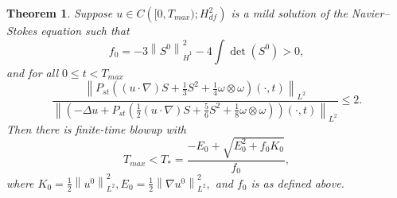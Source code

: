 \documentclass[11pt]{article}
\theoremstyle{plain}
\newtheorem{theorem}{Theorem}[section]
\theoremstyle{remark}
\numberwithin{equation}{section}
\begin{document}
\begin{theorem} \label{BlowupThmIntro}
Suppose $u\in C\left([0,T_{max});H^2_{df}\right)$ is a mild solution of the Navier--Stokes equation such that
\begin{equation}
    f_0=-3\left\|S^0\right\|_{\dot{H}^1}^2
    -4\int\det\left(S^0\right)>0,
\end{equation}
and for all $0\leq t<T_{max}$
\begin{equation}
    \frac{\left\|P_{st}\left((u\cdot\nabla)S+\frac{1}{3}S^2
    +\frac{1}{4}\omega\otimes\omega
    \right)(\cdot,t)\right\|_{L^2}}
    {\left\|\left(-\Delta u+P_{st}\left(
    \frac{1}{2}(u\cdot\nabla)S+\frac{5}{6}S^2
    +\frac{1}{8}\omega\otimes\omega\right)
    \right)(\cdot,t)\right\|_{L^2}}
    \leq
    2.
\end{equation}
Then there is finite-time blowup with
\begin{equation}
    T_{max}
    <
    T_*
    =
    \frac{-E_0+\sqrt{E_0^2+f_0 K_0}}
    {f_0},
\end{equation}
where
$K_0 = \frac{1}{2}\left\|u^0\right\|_{L^2}^2,
E_0 = \frac{1}{2}\left\|\nabla u^0\right\|_{L^2}^2,$
and $f_0$ is as defined above.
\end{theorem}
\end{document}
